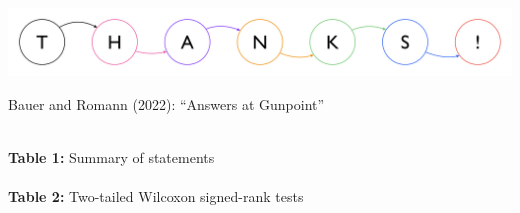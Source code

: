 \documentclass[xcolor=table,9pt,aspectratio=169]{beamer}
\begin{document}
\begin{frame}{}
\vspace*{-5mm}
\begin{center}
   {\includegraphics[width=\linewidth]{figures/thanks.pdf}}
\end{center}
\end{frame}


\begin{frame}{\vspace*{10mm}Bauer and Romann (2022): ``Answers at Gunpoint''}
\vspace*{-5mm}
\begin{multicols}{2}
\begin{center}
   \\
   {\footnotesize\textbf{Table 1:} Summary of statements}\\
   \\
   {\footnotesize\textbf{Table 2:} Two-tailed Wilcoxon signed-rank tests}
\end{center}
\end{multicols}
\end{frame}
\end{document}
